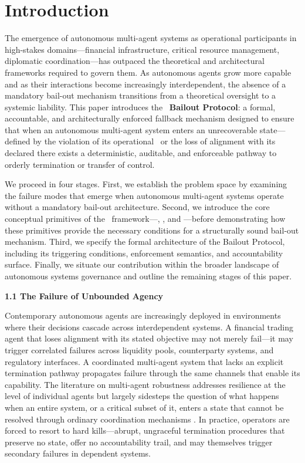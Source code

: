 \section{Introduction}

The emergence of autonomous multi-agent systems as operational participants in high-stakes domains—financial infrastructure, critical resource management, diplomatic coordination—has outpaced the theoretical and architectural frameworks required to govern them. As autonomous agents grow more capable and as their interactions become increasingly interdependent, the absence of a mandatory bail-out mechanism transitions from a theoretical oversight to a systemic liability. This paper introduces the \bxthree\ \textbf{Bailout Protocol}: a formal, accountable, and architecturally enforced fallback mechanism designed to ensure that when an autonomous multi-agent system enters an unrecoverable state—defined by the violation of its operational \bounds\ or the loss of alignment with its declared \purpose\—there exists a deterministic, auditable, and enforceable pathway to orderly termination or transfer of control.

We proceed in four stages. First, we establish the problem space by examining the failure modes that emerge when autonomous multi-agent systems operate without a mandatory bail-out architecture. Second, we introduce the core conceptual primitives of the \bxthree\ framework—\purpose, \bounds, and \fact—before demonstrating how these primitives provide the necessary conditions for a structurally sound bail-out mechanism. Third, we specify the formal architecture of the Bailout Protocol, including its triggering conditions, enforcement semantics, and accountability surface. Finally, we situate our contribution within the broader landscape of autonomous systems governance and outline the remaining stages of this paper.

\bigskip
\noindent\textbf{1.1 The Failure of Unbounded Agency}

Contemporary autonomous agents are increasingly deployed in environments where their decisions cascade across interdependent systems. A financial trading agent that loses alignment with its stated objective may not merely fail—it may trigger correlated failures across liquidity pools, counterparty systems, and regulatory interfaces. A coordinated multi-agent system that lacks an explicit termination pathway propagates failure through the same channels that enable its capability. The literature on multi-agent robustness addresses resilience at the level of individual agents but largely sidesteps the question of what happens when an entire system, or a critical subset of it, enters a state that cannot be resolved through ordinary coordination mechanisms \cite{foisi2024multi, zhou2023agent}. In practice, operators are forced to resort to hard kills—abrupt, ungraceful termination procedures that preserve no state, offer no accountability trail, and may themselves trigger secondary failures in dependent systems.

